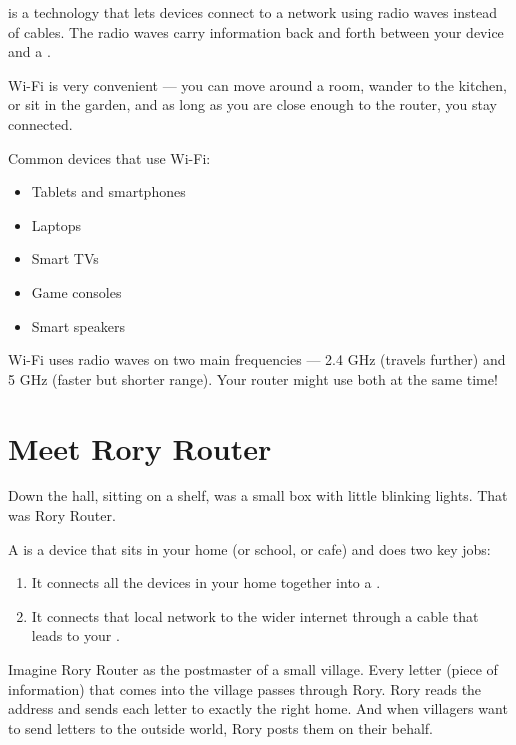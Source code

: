  is a technology that lets devices connect to a network using radio waves instead of cables.
The radio waves carry information back and forth between your device and a .

Wi-Fi is very convenient — you can move around a room, wander to the kitchen, or sit in the garden,
and as long as you are close enough to the router, you stay connected.

Common devices that use Wi-Fi:
\begin{itemize}
  \item Tablets and smartphones
  \item Laptops
  \item Smart TVs
  \item Game consoles
  \item Smart speakers
\end{itemize}

\begin{funfact}
Wi-Fi uses radio waves on two main frequencies — 2.4 GHz (travels further) and 5 GHz (faster but shorter range). Your router might use both at the same time!
\end{funfact}

\sectionrule

\section*{Meet Rory Router}

Down the hall, sitting on a shelf, was a small box with little blinking lights.
That was Rory Router.


A  is a device that sits in your home (or school, or cafe) and does two key jobs:

\begin{enumerate}[label=\textbf{\arabic*.}]
  \item It connects all the devices in your home together into a .
  \item It connects that local network to the wider internet through a cable that leads to your .
\end{enumerate}

\begin{picturethis}
  Imagine Rory Router as the postmaster of a small village.
  Every letter (piece of information) that comes into the village
  passes through Rory.
  Rory reads the address and sends each letter to exactly the right home.
  And when villagers want to send letters to the outside world,
  Rory posts them on their behalf.
\end{picturethis}


